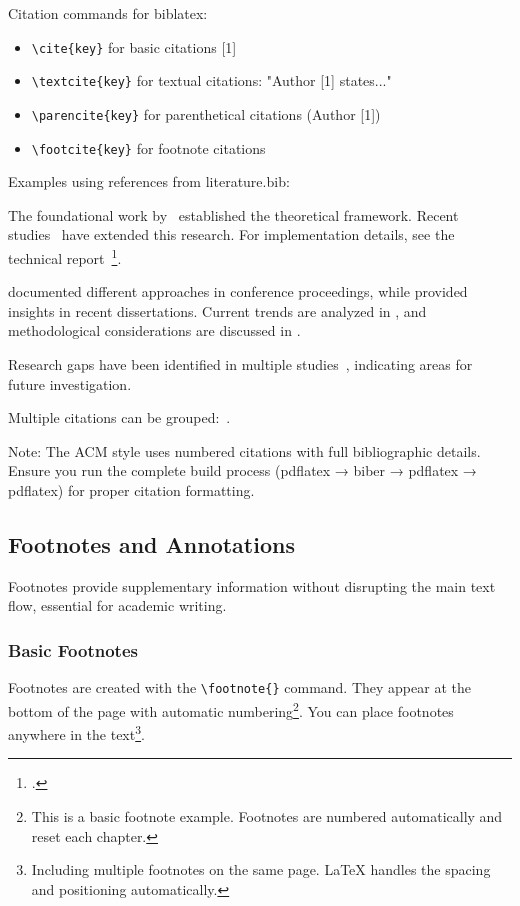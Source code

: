 Citation commands for biblatex:
\begin{itemize}
    \item \verb+\cite{key}+ for basic citations [1]
    \item \verb+\textcite{key}+ for textual citations: "Author [1] states..."
    \item \verb+\parencite{key}+ for parenthetical citations (Author [1])
    \item \verb+\footcite{key}+ for footnote citations
\end{itemize}

Examples using references from literature.bib:

The foundational work by~\cite{sample_reference_2020} established the theoretical framework. Recent studies~\cite{another_reference_2021,recent_study_1} have extended this research. For implementation details, see the technical report~\footcite{example_study_1}.

\textcite{foundational_reference_1} documented different approaches in conference proceedings, while \textcite{example_study_2} provided insights in recent dissertations. Current trends are analyzed in \parencite{trend_reference}, and methodological considerations are discussed in \cite{qualitative_example,mixed_methods_example}.

Research gaps have been identified in multiple studies~\cite{gap_evidence_1,gap_evidence_2,gap_evidence_3}, indicating areas for future investigation.

Multiple citations can be grouped:~\cite{sample_reference_2020,another_reference_2021,recent_study_1}.

Note: The ACM style uses numbered citations with full bibliographic details. Ensure you run the complete build process (pdflatex → biber → pdflatex → pdflatex) for proper citation formatting.

\subsection{Footnotes and Annotations}

Footnotes provide supplementary information without disrupting the main text flow, essential for academic writing.

\subsubsection{Basic Footnotes}

Footnotes are created with the \verb+\footnote{}+ command. They appear at the bottom of the page with automatic numbering\footnote{This is a basic footnote example. Footnotes are numbered automatically and reset each chapter.}. You can place footnotes anywhere in the text\footnote{Including multiple footnotes on the same page. LaTeX handles the spacing and positioning automatically.}.

